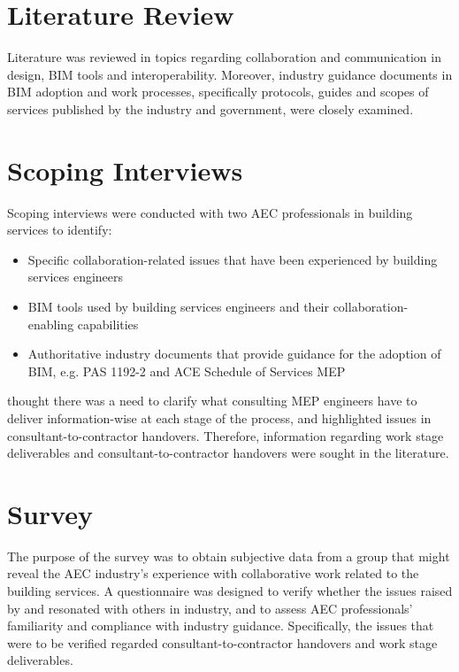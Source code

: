 \section{Literature Review}

Literature was reviewed in topics regarding collaboration and communication in design, BIM tools and interoperability.
Moreover, industry guidance documents in BIM adoption and work processes, specifically protocols, guides and scopes of services published by the industry and government, were closely examined.

\section{Scoping Interviews}

Scoping interviews were conducted with two AEC professionals \citep{Quigley2017, Conaghan2017} in building services to identify:
\begin{itemize}
	\item Specific collaboration-related issues that have been experienced by building services engineers
	\item BIM tools used by building services engineers and their collaboration-enabling capabilities
	\item Authoritative industry documents that provide guidance for the adoption of BIM, e.g. PAS 1192-2 and ACE Schedule of Services MEP
\end{itemize}
\cite{Quigley2017} thought there was a need to clarify what consulting MEP engineers have to deliver information-wise at each stage of the process, and \cite{Conaghan2017} highlighted issues in consultant-to-contractor handovers.
Therefore, information regarding work stage deliverables and consultant-to-contractor handovers were sought in the literature.


\section{Survey} \label{sec_survey}

The purpose of the survey was to obtain subjective data from a group that might reveal the AEC industry's experience with collaborative work related to the building services.
A questionnaire was designed to verify whether the issues raised by \cite{Quigley2017} and \cite{Conaghan2017} resonated with others in industry, and to assess AEC professionals' familiarity and compliance with industry guidance.
Specifically, the issues that were to be verified regarded consultant-to-contractor handovers and work stage deliverables.

